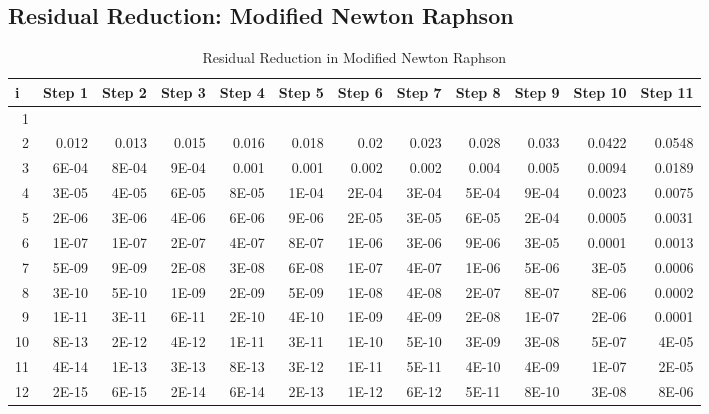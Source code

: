 \documentclass[11pt]{article}
\begin{document}
\subsection*{Residual Reduction: Modified Newton Raphson}
\begin{table}[htbp]
  \centering
  \caption{Residual Reduction in Modified Newton Raphson}
    \begin{tabular}{rrrrrrrrrrrr}
    \toprule
    \multicolumn{1}{l}{\textbf{i}} & \multicolumn{1}{l}{\textbf{Step 1}} & \multicolumn{1}{l}{\textbf{Step 2}} & \multicolumn{1}{l}{\textbf{Step 3}} & \multicolumn{1}{l}{\textbf{Step 4}} & \multicolumn{1}{l}{\textbf{Step 5}} & \multicolumn{1}{l}{\textbf{Step 6}} & \multicolumn{1}{l}{\textbf{Step 7}} & \multicolumn{1}{l}{\textbf{Step 8}} & \multicolumn{1}{l}{\textbf{Step 9}} & \multicolumn{1}{l}{\textbf{Step 10}} & \multicolumn{1}{l}{\textbf{Step 11}} \\
    \midrule
    1     &       &       &       &       &       &       &       &       &       &       &  \\
    2     & 0.012 & 0.013 & 0.015 & 0.016 & 0.018 & 0.02  & 0.023 & 0.028 & 0.033 & 0.0422 & 0.0548 \\
    3     & 6E-04 & 8E-04 & 9E-04 & 0.001 & 0.001 & 0.002 & 0.002 & 0.004 & 0.005 & 0.0094 & 0.0189 \\
    4     & 3E-05 & 4E-05 & 6E-05 & 8E-05 & 1E-04 & 2E-04 & 3E-04 & 5E-04 & 9E-04 & 0.0023 & 0.0075 \\
    5     & 2E-06 & 3E-06 & 4E-06 & 6E-06 & 9E-06 & 2E-05 & 3E-05 & 6E-05 & 2E-04 & 0.0005 & 0.0031 \\
    6     & 1E-07 & 1E-07 & 2E-07 & 4E-07 & 8E-07 & 1E-06 & 3E-06 & 9E-06 & 3E-05 & 0.0001 & 0.0013 \\
    7     & 5E-09 & 9E-09 & 2E-08 & 3E-08 & 6E-08 & 1E-07 & 4E-07 & 1E-06 & 5E-06 & 3E-05 & 0.0006 \\
    8     & 3E-10 & 5E-10 & 1E-09 & 2E-09 & 5E-09 & 1E-08 & 4E-08 & 2E-07 & 8E-07 & 8E-06 & 0.0002 \\
    9     & 1E-11 & 3E-11 & 6E-11 & 2E-10 & 4E-10 & 1E-09 & 4E-09 & 2E-08 & 1E-07 & 2E-06 & 0.0001 \\
    10    & 8E-13 & 2E-12 & 4E-12 & 1E-11 & 3E-11 & 1E-10 & 5E-10 & 3E-09 & 3E-08 & 5E-07 & 4E-05 \\
    11    & 4E-14 & 1E-13 & 3E-13 & 8E-13 & 3E-12 & 1E-11 & 5E-11 & 4E-10 & 4E-09 & 1E-07 & 2E-05 \\
    12    & 2E-15 & 6E-15 & 2E-14 & 6E-14 & 2E-13 & 1E-12 & 6E-12 & 5E-11 & 8E-10 & 3E-08 & 8E-06 \\

\end{tabular}
\end{table}
\end{document}
